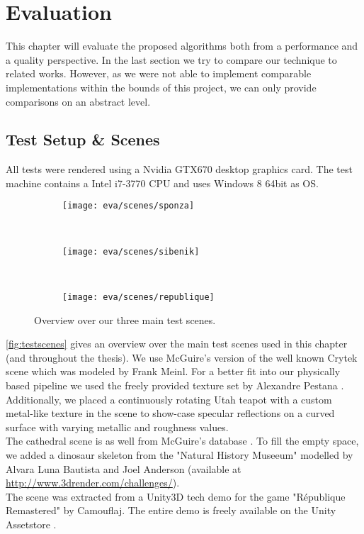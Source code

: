 \documentclass[thesis.tex]{subfiles}
\begin{document}
\chapter{Evaluation}\label{chap:eva}
This chapter will evaluate the proposed algorithms both from a performance and a quality perspective.
In the last section we try to compare our technique to related works.
However, as we were not able to implement comparable implementations within the bounds of this project, we can only provide comparisons on an abstract level.

\section{Test Setup \& Scenes} \label{sec:eva:setup}
All tests were rendered using a Nvidia GTX670 desktop graphics card.
The test machine contains a Intel i7-3770 CPU and uses Windows 8 64bit as OS.

\begin{figure}
\centering
\begin{subfigure}[b]{0.8\textwidth}
\centering
\texttt{[image: eva/scenes/sponza]}
\caption{}
\end{subfigure}
\\
\begin{subfigure}[b]{0.8\textwidth}
\centering
\texttt{[image: eva/scenes/sibenik]}
\caption{}
\end{subfigure}
\\
\begin{subfigure}[b]{0.8\textwidth}
\centering
\texttt{[image: eva/scenes/republique]}
\caption{}
\end{subfigure}
\caption{Overview over our three main test scenes.}
\label{fig:testscenes}
\end{figure}
\autoref{fig:testscenes} gives an overview over the main test scenes used in this chapter (and throughout the thesis).
We use McGuire's \cite{bib:McGuire2011Data} version of the well known Crytek  scene which was modeled by Frank Meinl.
For a better fit into our physically based pipeline we used the freely provided texture set  by Alexandre Pestana \cite{bib:sponzapbr}.
Additionally, we placed a continuously rotating Utah teapot with a custom metal-like texture in the scene to show-case specular reflections on a curved surface with varying metallic and roughness values.
\\
The  cathedral scene is as well from McGuire's database \cite{bib:McGuire2011Data}.
To fill the empty space, we added a dinosaur skeleton from the "Natural History Museeum" modelled by Alvara Luna Bautista and Joel Anderson (available at \url{http://www.3drender.com/challenges/}).
\\
The  scene was extracted from a Unity3D tech demo for the game "République Remastered" by Camouflaj.
The entire demo is freely available on the Unity Assetstore \cite{bib:republique}.
\end{document}
